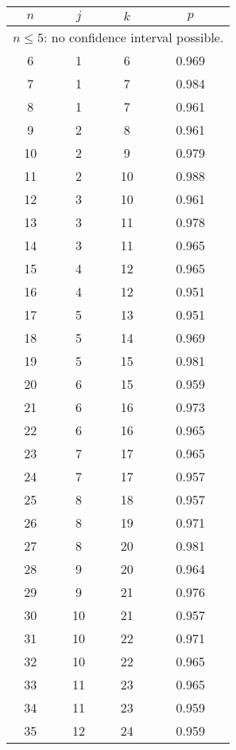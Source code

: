 
\begin{table}\center \scriptsize
\hspace{2mm}
 \begin{tabular}{|c|c|c|c|}
 \hline $n$ & $j$ & $k$ & $p$ \\ \hline \hline
\multicolumn{4}{|c|}{
$n \leq 5 $: no confidence interval possible.}\\ \hline
 6  & 1  & 6 & 0.969  \\ \hline
 7  & 1  & 7 & 0.984  \\ \hline
 8  & 1  & 7 & 0.961  \\ \hline
 9  & 2  & 8 & 0.961  \\ \hline
 10  & 2  & 9 & 0.979  \\ \hline
 11  & 2  & 10 & 0.988  \\ \hline
 12  & 3  & 10 & 0.961  \\ \hline
 13  & 3  & 11 & 0.978  \\ \hline
 14  & 3  & 11 & 0.965  \\ \hline
 15  & 4  & 12 & 0.965  \\ \hline
 16  & 4  & 12 & 0.951  \\ \hline
 17  & 5  & 13 & 0.951  \\ \hline
 18  & 5  & 14 & 0.969  \\ \hline
 19  & 5  & 15 & 0.981  \\ \hline
 20  & 6  & 15 & 0.959  \\ \hline
 21  & 6  & 16 & 0.973  \\ \hline
 22  & 6  & 16 & 0.965  \\ \hline
 23  & 7  & 17 & 0.965  \\ \hline
 24  & 7  & 17 & 0.957  \\ \hline
 25  & 8  & 18 & 0.957  \\ \hline
 26  & 8  & 19 & 0.971  \\ \hline
 27  & 8  & 20 & 0.981  \\ \hline
 28  & 9  & 20 & 0.964  \\ \hline
 29  & 9  & 21 & 0.976  \\ \hline
 30  & 10  & 21 & 0.957  \\ \hline
 31  & 10  & 22 & 0.971  \\ \hline
 32  & 10  & 22 & 0.965  \\ \hline
 33  & 11  & 23 & 0.965  \\ \hline
 34  & 11  & 23 & 0.959  \\ \hline
 35  & 12  & 24 & 0.959  \\ \hline

\end{tabular}
\end{table}
